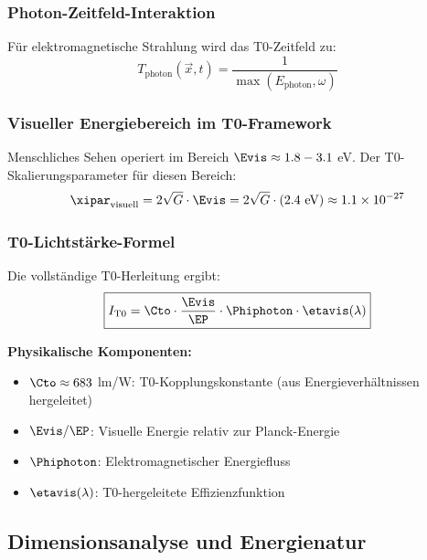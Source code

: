 	\subsubsection{Photon-Zeitfeld-Interaktion}
	\label{subsubsec:photon_zeitfeld}
	
	Für elektromagnetische Strahlung wird das T0-Zeitfeld zu:
	\begin{equation}
		T_{\text{photon}}(\vec{x},t) = \frac{1}{\max(E_{\text{photon}}, \omega)}
		\label{eq:photon_zeitfeld}
	\end{equation}
	
	\subsubsection{Visueller Energiebereich im T0-Framework}
	\label{subsubsec:visueller_energiebereich}
	
	Menschliches Sehen operiert im Bereich $\Evis \approx 1.8 - 3.1$ eV. Der T0-Skalierungsparameter für diesen Bereich:
	\begin{equation}
		\xipar_{\text{visuell}} = 2\sqrt{G} \cdot \Evis = 2\sqrt{G} \cdot (2.4 \text{ eV}) \approx 1.1 \times 10^{-27}
		\label{eq:xi_visuell}
	\end{equation}
	
	\subsubsection{T0-Lichtstärke-Formel}
	\label{subsubsec:t0_lichtstaerke_formel}
	
	Die vollständige T0-Herleitung ergibt:
	\begin{equation}
		\boxed{I_{\text{T0}} = \Cto \cdot \frac{\Evis}{\EP} \cdot \Phiphoton \cdot \etavis(\lambda)}
		\label{eq:t0_candela_fundamental}
	\end{equation}
	
	\textbf{Physikalische Komponenten:}
	\begin{itemize}
		\item $\Cto \approx 683$ lm/W: T0-Kopplungskonstante (aus Energieverhältnissen hergeleitet)
		\item $\Evis/\EP$: Visuelle Energie relativ zur Planck-Energie
		\item $\Phiphoton$: Elektromagnetischer Energiefluss
		\item $\etavis(\lambda)$: T0-hergeleitete Effizienzfunktion
	\end{itemize}
	
	\subsection{Dimensionsanalyse und Energienatur}
	\label{subsec:candela_dimensional}
	
